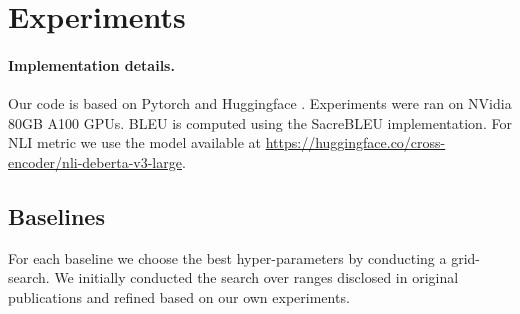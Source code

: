 \section{Experiments}
\label{app:experiments}

\paragraph{Implementation details.} Our code is based on Pytorch \citep{pytorch} and Huggingface \cite{huggingface-transformers}. Experiments were ran on NVidia 80GB A100 GPUs. BLEU is computed using the SacreBLEU \citep{sacrebleu} implementation. For NLI metric we use the model available at \url{https://huggingface.co/cross-encoder/nli-deberta-v3-large}.


\subsection{Baselines}\label{app:baselines}
For each baseline we choose the best hyper-parameters by conducting a grid-search. We initially conducted the search over ranges disclosed in original publications and refined based on our own experiments.

